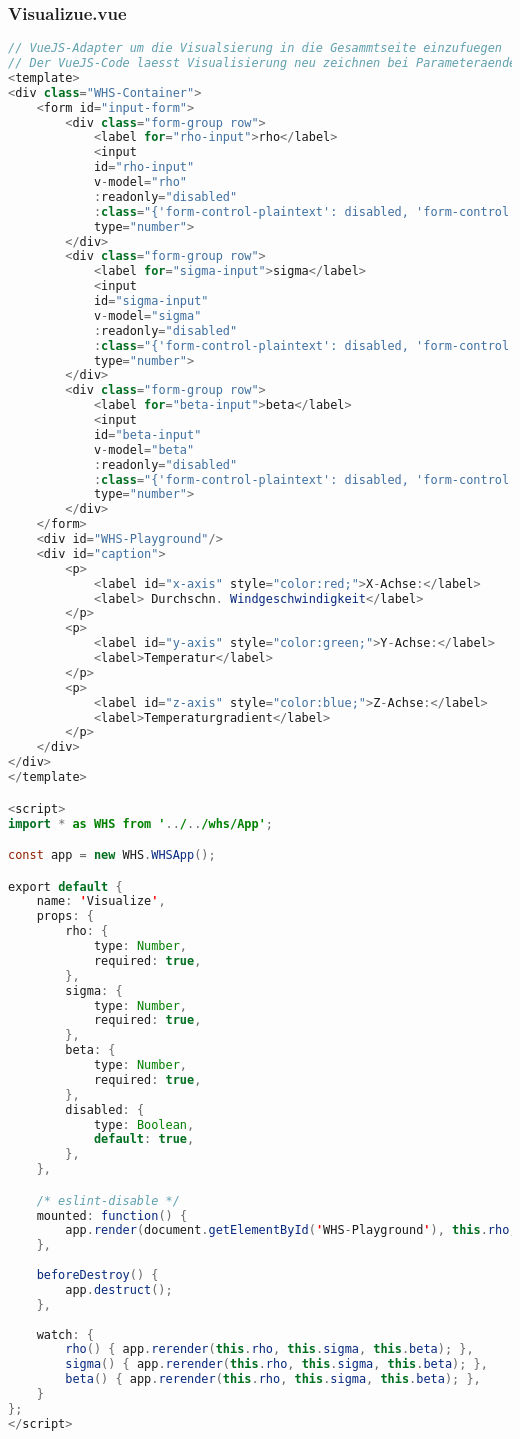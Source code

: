 \subsubsection{Visualizue.vue}
\begin{lstlisting}[style=C, language=Java]
// VueJS-Adapter um die Visualsierung in die Gesammtseite einzufuegen
// Der VueJS-Code laesst Visualisierung neu zeichnen bei Parameteraenderungen
<template>
<div class="WHS-Container">
	<form id="input-form">
		<div class="form-group row">
			<label for="rho-input">rho</label>
			<input
			id="rho-input"
			v-model="rho"
			:readonly="disabled"
			:class="{'form-control-plaintext': disabled, 'form-control': !disabled}"
			type="number">
		</div>
		<div class="form-group row">
			<label for="sigma-input">sigma</label>
			<input
			id="sigma-input"
			v-model="sigma"
			:readonly="disabled"
			:class="{'form-control-plaintext': disabled, 'form-control': !disabled}"
			type="number">
		</div>
		<div class="form-group row">
			<label for="beta-input">beta</label>
			<input
			id="beta-input"
			v-model="beta"
			:readonly="disabled"
			:class="{'form-control-plaintext': disabled, 'form-control': !disabled}"
			type="number">
		</div>
	</form>
	<div id="WHS-Playground"/>
	<div id="caption">
		<p>
			<label id="x-axis" style="color:red;">X-Achse:</label>
			<label> Durchschn. Windgeschwindigkeit</label>
		</p>
		<p>
			<label id="y-axis" style="color:green;">Y-Achse:</label>
			<label>Temperatur</label>
		</p>
		<p>
			<label id="z-axis" style="color:blue;">Z-Achse:</label>
			<label>Temperaturgradient</label>
		</p>
	</div>
</div>
</template>

<script>
import * as WHS from '../../whs/App';

const app = new WHS.WHSApp();

export default {
	name: 'Visualize',
	props: {
		rho: {
			type: Number,
			required: true,
		},
		sigma: {
			type: Number,
			required: true,
		},
		beta: {
			type: Number,
			required: true,
		},
		disabled: {
			type: Boolean,
			default: true,
		},
	},

	/* eslint-disable */
	mounted: function() {
		app.render(document.getElementById('WHS-Playground'), this.rho, this.sigma, this.beta);
	},
	
	beforeDestroy() {
		app.destruct();
	},
	
	watch: {
		rho() { app.rerender(this.rho, this.sigma, this.beta); },
		sigma() { app.rerender(this.rho, this.sigma, this.beta); },
		beta() { app.rerender(this.rho, this.sigma, this.beta); },
	}
};
</script>
\end{lstlisting}
